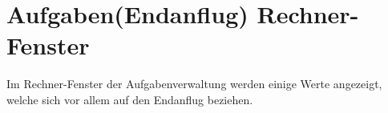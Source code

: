 









\section{Aufgaben(Endanflug) Rechner-Fenster} \label{sec:task-calc-dial}
Im Rechner-Fenster der Aufgabenverwaltung werden einige Werte angezeigt, welche sich vor allem auf den Endanflug beziehen.

